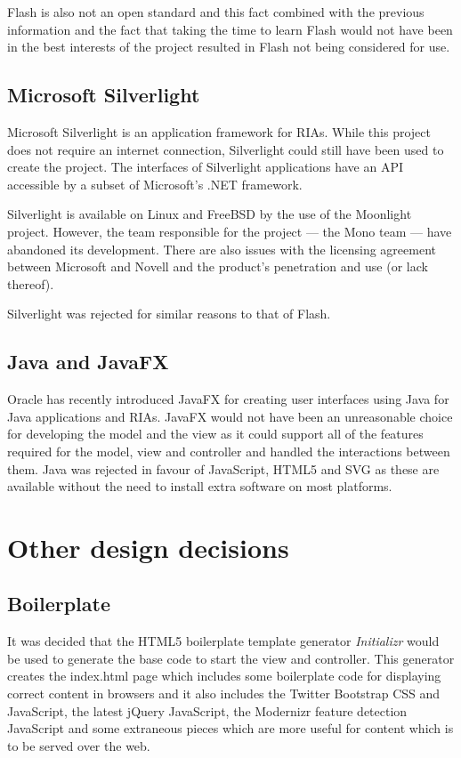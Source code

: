 Flash is also not an open standard and this fact combined with the previous information and the fact that taking the time to learn Flash would not have been in the best interests of the project resulted in Flash not being considered for use.
\subsection{Microsoft Silverlight}
Microsoft Silverlight is an application framework for RIAs. While this project does not require an internet connection, Silverlight could still have been used to create the project. The interfaces of Silverlight applications have an API accessible by a subset of Microsoft's .NET framework.

Silverlight is available on Linux and FreeBSD by the use of the Moonlight project. However, the team responsible for the project --- the Mono team --- have abandoned its development. There are also issues with the licensing agreement between Microsoft and Novell and the product's penetration and use (or lack thereof).

Silverlight was rejected for similar reasons to that of Flash.

\subsection{Java and JavaFX}
Oracle has recently introduced JavaFX for creating user interfaces using Java for Java applications and RIAs. JavaFX would not have been an unreasonable choice for developing the model and the view as it could support all of the features required for the model, view and controller and handled the interactions between them. Java was rejected in favour of Java\-Script, HTML5 and SVG as these are available without the need to install extra software on most platforms.

\section{Other design decisions}
\subsection{Boilerplate}
It was decided that the HTML5 boilerplate template generator \emph{Initializr} would be used to generate the base code to start the view and controller. This generator creates the index.html page which includes some boilerplate code for displaying correct content in browsers and it also includes the Twitter Bootstrap CSS and Java\-Script, the latest jQuery Java\-Script, the Modernizr feature detection Java\-Script and some extraneous pieces which are more useful for content which is to be served over the web.

